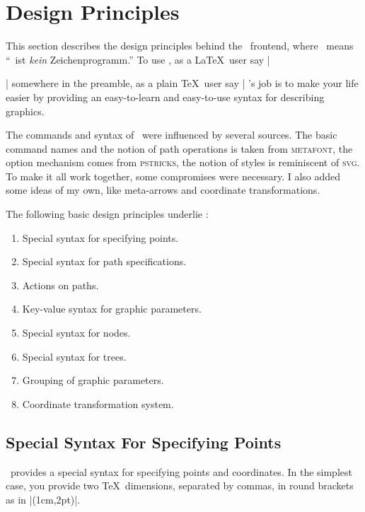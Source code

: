 %


\section{Design Principles}

This section describes the design principles behind the \tikzname\
frontend, where \tikzname\ means ``\tikzname\ ist \emph{kein}
Zeichenprogramm.'' To use \tikzname, as a \LaTeX\ user say
|\usepackage{tikz}| somewhere in the preamble, as a plain \TeX\ user
say | \tikzname's job is to make your life easier by
providing an easy-to-learn and easy-to-use syntax for describing
graphics. 

The commands and syntax of \tikzname\ were influenced by several
sources. The basic command names and the notion of  path operations is
taken from \textsc{metafont}, the option mechanism comes from
\textsc{pstricks}, the notion of styles is reminiscent of
\textsc{svg}. To make it all work together, some compromises were
necessary. I also added some ideas of my own, like meta-arrows and
coordinate transformations. 

The following basic design principles underlie \tikzname:
\begin{enumerate}
\item Special syntax for specifying points.
\item Special syntax for path specifications.
\item Actions on paths.
\item Key-value syntax for graphic parameters.
\item Special syntax for nodes.
\item Special syntax for trees.
\item Grouping of graphic parameters.
\item Coordinate transformation system.
\end{enumerate}



\subsection{Special Syntax For Specifying Points}

\tikzname\ provides a special syntax for specifying points and
coordinates. In the simplest case, you provide two \TeX\ dimensions,
separated by commas, in round brackets as in |(1cm,2pt)|.

